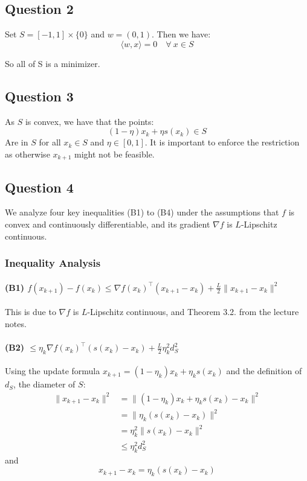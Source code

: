 \documentclass[12p]{article}
\begin{document}
\subsection*{Question 2} \hfil\par
Set \(S=[-1,1]\times\{0\}\) and \(w=(0,1)\). Then we have:
\[
    \langle w, x\rangle=0 \quad \forall\ x\in S  
\]

So all of S is a minimizer.
\subsection*{Question 3} \hfil\par

As \(S\) is convex, we have that the points:
\[
    (1-\eta)x_k+\eta s(x_k)\in S    
\]
Are in \(S\) for all \(x_k\in S\) and \(\eta\in[0,1]\). It is important to enforce the restriction as otherwise \(x_{k+1}\) might not be feasible.

\subsection*{Question 4} 

We analyze four key inequalities (B1) to (B4) under the assumptions that \( f \) is convex and continuously differentiable, and its gradient \( \nabla f \) is \( L \)-Lipschitz continuous.

\subsubsection*{Inequality Analysis}

\paragraph*{(B1) \( f(x_{k+1}) - f(x_k) \leq \nabla f(x_k)^\top (x_{k+1} - x_k) + \frac{L}{2} \|x_{k+1} - x_k\|^2 \)}\hfil\par
This is due to \(\nabla f\) is \( L \)-Lipschitz continuous, and Theorem 3.2. from the lecture notes.

\paragraph*{(B2) \( \leq \eta_k \nabla f(x_k)^\top (s(x_k) - x_k) + \frac{L}{2} \eta_k^2 d_S^2 \)} \hfil\par
Using the update formula \( x_{k+1} = (1 - \eta_k)x_k + \eta_k s(x_k) \) and the definition of \( d_S \), the diameter of \( S \):
\begin{align*}
    \|x_{k+1} - x_k\|^2 &= \| (1 - \eta_k)x_k + \eta_k s(x_k) - x_k \|^2 \\
    &= \| \eta_k (s(x_k) - x_k) \|^2 \\
    &= \eta_k^2 \| s(x_k) - x_k \|^2 \\
    &\leq \eta_k^2 d_S^2
\end{align*}
and
\[
  x_{k+1} - x_k = \eta_k (s(x_k) - x_k)
\]
\end{document}
